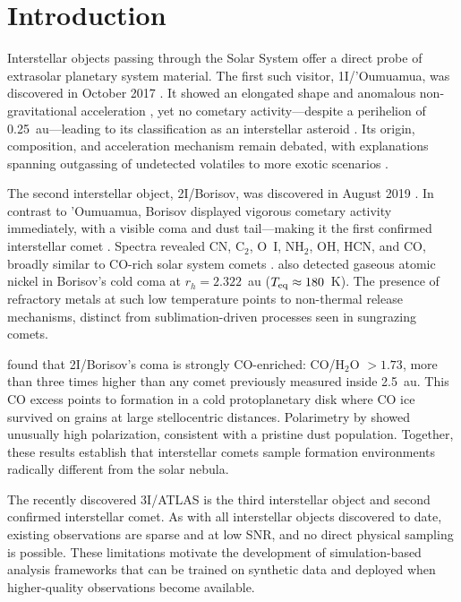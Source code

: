 \documentclass[preprint2]{aastex631}
\begin{document}

\section{Introduction}\label{sec:intro}

Interstellar objects passing through the Solar System offer a direct probe of extrasolar planetary system material. The first such visitor, 1I/'Oumuamua, was discovered in October 2017 \citep{meech17}. It showed an elongated shape and anomalous non-gravitational acceleration \citep{micheli18}, yet no cometary activity---despite a perihelion of 0.25~au---leading to its classification as an interstellar asteroid \citep{jewitt17}. Its origin, composition, and acceleration mechanism remain debated, with explanations spanning outgassing of undetected volatiles \citep{seligman23} to more exotic scenarios \citep{loeb18}.

The second interstellar object, 2I/Borisov, was discovered in August 2019 \citep{guzik19}. In contrast to 'Oumuamua, Borisov displayed vigorous cometary activity immediately, with a visible coma and dust tail---making it the first confirmed interstellar comet \citep{jewitt19}. Spectra revealed CN, C$_{2}$, O~I, NH$_{2}$, OH, HCN, and CO, broadly similar to CO-rich solar system comets \citep{fitzsimmons19,bodewits20}. \citet{guzik21} also detected gaseous atomic nickel in Borisov's cold coma at $r_h = 2.322$~au ($T_{\rm eq} \approx 180$~K). The presence of refractory metals at such low temperature points to non-thermal release mechanisms, distinct from sublimation-driven processes seen in sungrazing comets.

\citet{bodewits20} found that 2I/Borisov's coma is strongly CO-enriched: CO/H$_{2}$O $> 1.73$, more than three times higher than any comet previously measured inside 2.5~au. This CO excess points to formation in a cold protoplanetary disk where CO ice survived on grains at large stellocentric distances. Polarimetry by \citet{bagnulo22} showed unusually high polarization, consistent with a pristine dust population. Together, these results establish that interstellar comets sample formation environments radically different from the solar nebula.

The recently discovered 3I/ATLAS \citep{atlas25} is the third interstellar object and second confirmed interstellar comet. As with all interstellar objects discovered to date, existing observations are sparse and at low SNR, and no direct physical sampling is possible. These limitations motivate the development of simulation-based analysis frameworks that can be trained on synthetic data and deployed when higher-quality observations become available.
\end{document}
